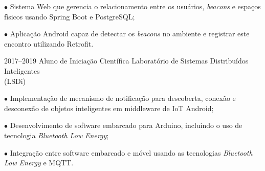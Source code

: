 \documentclass[]{../document-class/twentysecondcv}
\begin{document}
\begin{twenty}
{			$\bullet$ Sistema Web que gerencia o relacionamento entre os usuários, \textit{beacons} e espaços físicos usando Spring Boot e PostgreSQL;\vskip 4pt
        
			$\bullet$ Aplicação Android capaz de detectar os \textit{beacons} no ambiente e registrar este encontro utilizando Retrofit.
		}
			
	\twentyitem
		{2017--2019}
		{Aluno de Iniciação Científica}
		{Laboratório de Sistemas Distribuídos Inteligentes \\\hspace*{\fill}(LSDi)}
		{
			$\bullet$ Implementação de mecanismo de notificação para descoberta, conexão e desconexão de objetos inteligentes em middleware de IoT Android;\vskip 4pt

			$\bullet$ Desenvolvimento de software embarcado para Arduino, incluindo o uso de tecnologia \textit{Bluetooth Low Energy};\vskip 4pt

			$\bullet$ Integração entre software embarcado e móvel usando as tecnologias \textit{Bluetooth Low Energy} e MQTT.
		}
\end{twenty}
\end{document}
